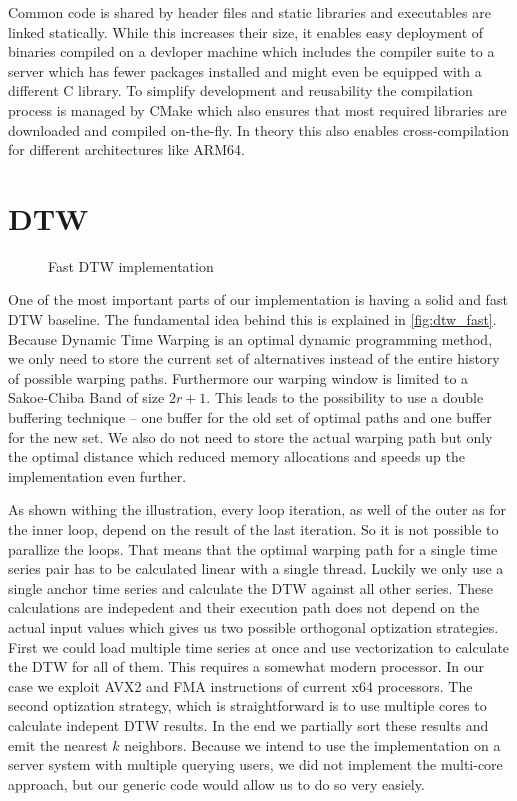 Common code is shared by header files and static libraries and executables are linked statically. While this increases their size, it enables easy deployment of binaries compiled on a devloper machine which includes the compiler suite to a server which has fewer packages installed and might even be equipped with a different C library. To simplify development and reusability the compilation process is managed by CMake which also ensures that most required libraries are downloaded and compiled on-the-fly. In theory this also enables cross-compilation for different architectures like ARM64.



\section{DTW}
\label{sec:implementation:dtw}

\begin{figure}
    \centering
    
    \caption{Fast DTW implementation}
    \label{fig:dtw_fast}
\end{figure}

One of the most important parts of our implementation is having a solid and fast DTW baseline. The fundamental idea behind this is explained in \autoref{fig:dtw_fast}. Because Dynamic Time Warping is an optimal dynamic programming method, we only need to store the current set of alternatives instead of the entire history of possible warping paths. Furthermore our warping window is limited to a Sakoe-Chiba Band of size $2r + 1$. This leads to the possibility to use a double buffering technique -- one buffer for the old set of optimal paths and one buffer for the new set. We also do not need to store the actual warping path but only the optimal distance which reduced memory allocations and speeds up the implementation even further.

As shown withing the illustration, every loop iteration, as well of the outer as for the inner loop, depend on the result of the last iteration. So it is not possible to parallize the loops. That means that the optimal warping path for a single time series pair has to be calculated linear with a single thread. Luckily we only use a single anchor time series and calculate the DTW against all other series. These calculations are indepedent and their execution path does not depend on the actual input values which gives us two possible orthogonal optization strategies. First we could load multiple time series at once and use vectorization to calculate the DTW for all of them. This requires a somewhat modern processor. In our case we exploit AVX2 and FMA instructions of current x64 processors. The second optization strategy, which is straightforward is to use multiple cores to calculate indepent DTW results. In the end we partially sort these results and emit the nearest $k$ neighbors. Because we intend to use the implementation on a server system with multiple querying users, we did not implement the multi-core approach, but our generic code would allow us to do so very easiely.


